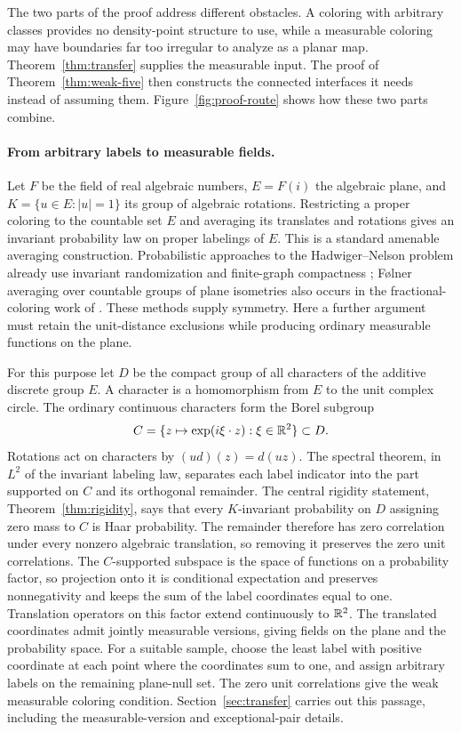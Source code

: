 The two parts of the proof address different obstacles. A coloring with
arbitrary classes provides no density-point structure to use, while a measurable
coloring may have boundaries far too irregular to analyze as a planar
map. Theorem~\ref{thm:transfer} supplies the measurable input. The proof
of Theorem~\ref{thm:weak-five} then constructs the connected interfaces
it needs instead of assuming them. Figure~\ref{fig:proof-route} shows how
these two parts combine.

\paragraph{From arbitrary labels to measurable fields.}
Let $F$ be the field of real algebraic numbers, $E=F(i)$ the algebraic
plane, and $K=\{u\in E:|u|=1\}$ its group of algebraic rotations.
Restricting a proper coloring to the countable set $E$ and averaging
its translates and rotations gives an invariant probability law on
proper labelings of $E$. This is a standard amenable averaging
construction. Probabilistic approaches to the Hadwiger--Nelson problem
already use invariant randomization and finite-graph compactness
\citep{BourgeatHeinrichMelottiRobert2015,GwynStavrianos2020};
F\o lner averaging over countable groups of plane isometries also occurs
in the fractional-coloring work of
\citet{MatolcsiRuzsaVargaZsamboki2025}. These methods supply symmetry.
Here a further argument must retain the unit-distance exclusions while
producing ordinary measurable functions on the plane.

For this purpose let $D$ be the compact group of all characters of the
additive discrete group $E$. A character is a homomorphism from $E$ to
the unit complex circle. The ordinary continuous characters form the
Borel subgroup
\[
 C=\{z\mapsto\exp(i\xi\cdot z):\xi\in\mathbb R^2\}\subset D.
\]
Rotations act on characters by $(ud)(z)=d(uz)$.
The spectral theorem, in $L^2$ of the invariant labeling law,
separates each label indicator into the part
supported on $C$ and its orthogonal remainder. The central rigidity
statement, Theorem~\ref{thm:rigidity}, says that every $K$-invariant
probability on $D$ assigning zero mass to $C$ is Haar probability. The
remainder therefore has zero correlation under every nonzero algebraic
translation, so removing it preserves the zero unit correlations.
The $C$-supported subspace is the space of functions on a probability
factor, so projection onto it is conditional expectation and preserves
nonnegativity and keeps the sum of the label coordinates equal to one.
Translation operators on this factor extend continuously to $\mathbb R^2$.
The translated coordinates admit jointly measurable versions, giving
fields on the plane and the probability space. For a suitable sample,
choose the least label with positive coordinate at each point
where the coordinates sum to one, and assign arbitrary labels on the
remaining plane-null set. The zero unit correlations give the weak
measurable coloring condition. Section~\ref{sec:transfer} carries out this passage, including
the measurable-version and exceptional-pair details.

